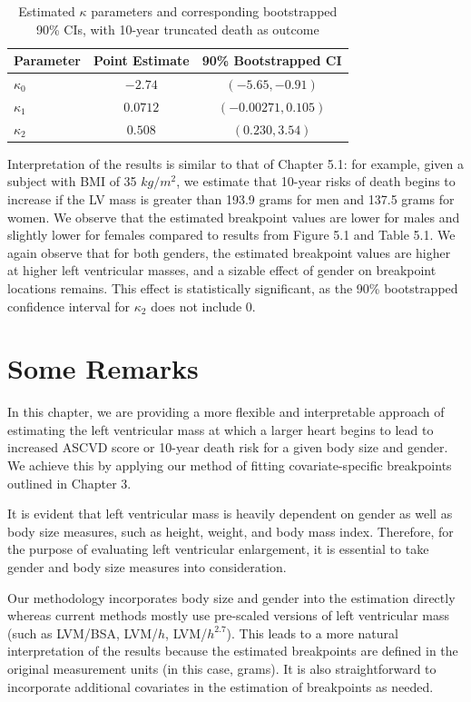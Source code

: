 \documentclass [12pt, proquest] {uwthesis}[2016/11/22]
\begin{document}
\begin{table}
\centering
\renewcommand\arraystretch{0.75}
\begin{tabular}{@{} lcc @{}} 
\toprule
    {Parameter} & {Point Estimate} & {90\% Bootstrapped CI} \\
\midrule
    $\kappa_0$ & $-2.74$ & $(-5.65, -0.91)$ \\
    $\kappa_1$ & $0.0712$ & $(-0.00271, 0.105)$ \\
    $\kappa_2$ & $0.508$ & $(0.230, 3.54)$ \\
\bottomrule
\end{tabular}
\caption{Estimated $\kappa$ parameters and corresponding bootstrapped 90\% CIs, with 10-year truncated death as outcome}
\end{table}

Interpretation of the results is similar to that of Chapter 5.1: for example, given a subject with BMI of 35 $kg/m^2$, we estimate that 10-year risks of death begins to increase if the LV mass is greater than 193.9 grams for men and 137.5 grams for women. We observe that the estimated breakpoint values are lower for males and slightly lower for females compared to results from Figure 5.1 and Table 5.1. We again observe that for both genders, the estimated breakpoint values are higher at higher left ventricular masses, and a sizable effect of gender on breakpoint locations remains. This effect is statistically significant, as the 90\% bootstrapped confidence interval for $\kappa_2$ does not include 0.

\section{Some Remarks}

In this chapter, we are providing a more flexible and interpretable approach of estimating the left ventricular mass at which a larger heart begins to lead to increased ASCVD score or 10-year death risk for a given body size and gender. We achieve this by applying our method of fitting covariate-specific breakpoints outlined in Chapter 3.

It is evident that left ventricular mass is heavily dependent on gender as well as body size measures, such as height, weight, and body mass index. Therefore, for the purpose of evaluating left ventricular enlargement, it is essential to take gender and body size measures into consideration.

Our methodology incorporates body size and gender into the estimation directly whereas current methods mostly use pre-scaled versions of left ventricular mass (such as LVM/BSA, LVM/$h$, LVM/$h^{2.7}$). This leads to a more natural interpretation of the results because the estimated breakpoints are defined in the original measurement units (in this case, grams). It is also straightforward to incorporate additional covariates in the estimation of breakpoints as needed.
\end{document}
